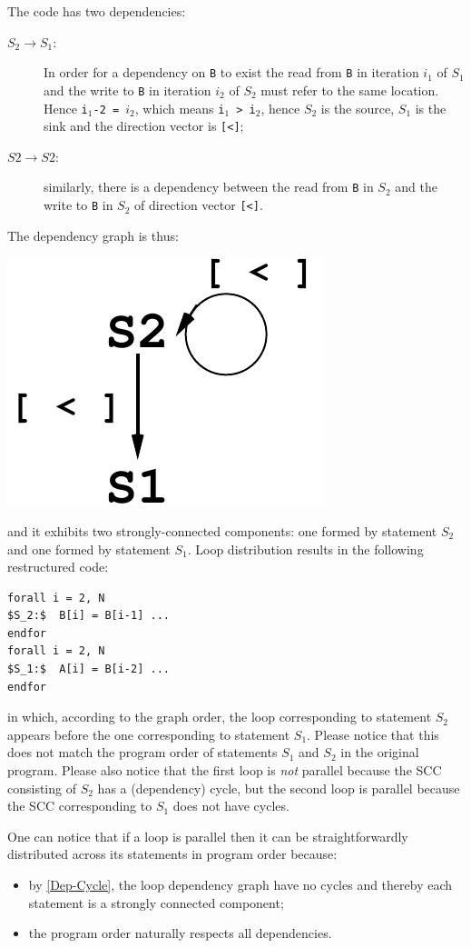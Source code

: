 \documentclass[acmsmall,review]{acmart}\settopmatter{printfolios=true,printccs=false,printacmref=false}
\begin{document}
The code has two dependencies:
\begin{description}
    \item[$S_2\to S_1$:]  In order for a dependency on {\tt B} to exist
        the read from {\tt B} in iteration $i_1$ of $S_1$ and 
        the write to {\tt B} in iteration $i_2$ of $S_2$ must refer
        to the same location. Hence {\tt i$_1$-2 = $i_2$}, which means
        {\tt i$_1$ > i$_2$}, hence $S_2$ is the source, $S_1$ is the
        sink and the direction vector is {\tt[<]};
    \item[$S2\to S2$:] similarly, there is a dependency between the
        read from {\tt B} in $S_2$ and the write to {\tt B} in $S_2$
        of direction vector {\tt[<]}.   
\end{description}

The dependency graph is thus:

\includegraphics[height=15ex]{Figures/L5/LoopDistr}

\noindent and it exhibits two strongly-connected components:
one formed by statement $S_2$ and one formed by statement $S_1$.
Loop distribution results in the following restructured code:
\begin{lstlisting}[mathescape=true]
forall i = 2, N
$S_2:$  B[i] = B[i-1] ...
endfor
forall i = 2, N
$S_1:$  A[i] = B[i-2] ...
endfor
\end{lstlisting}\vspace{-2ex}
in which, according to the graph order, the loop corresponding to
statement $S_2$ appears before the one corresponding to statement
$S_1$. Please notice that this does not match the program order 
of statements $S_1$ and $S_2$ in the original program. Please also 
notice that the first loop is {\em not} parallel because the SCC 
consisting of $S_2$ has a (dependency) cycle, but the second loop 
is parallel because the SCC corresponding to $S_1$ does not have 
cycles.

One can notice that if a loop is parallel then it can be straightforwardly
distributed across its statements in program order because:
\begin{itemize}
    \item by \cref{Dep-Cycle}, the loop dependency graph have no
            cycles and thereby each statement is a strongly connected
            component; 
    \item the program order naturally respects all dependencies.
\end{itemize}
\end{document}

